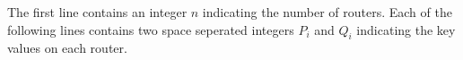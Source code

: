The first line contains an integer $n$ indicating the number of routers.
Each of the following lines contains two space seperated integers $P_i$ and $Q_i$
indicating the key values on each router.
